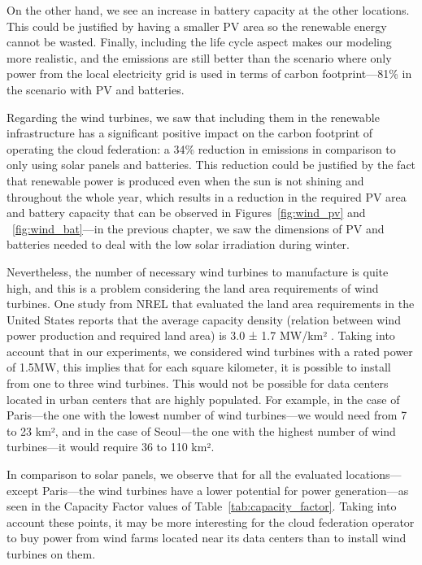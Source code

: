 On the other hand, we see an increase in battery capacity at the other locations. This could be justified by having a smaller PV area so the renewable energy cannot be wasted. Finally, including the life cycle aspect makes our modeling more realistic, and the emissions are still better than the scenario where only power from the local electricity grid is used in terms of carbon footprint---81\% in the scenario with PV and batteries.  


Regarding the wind turbines, we saw that including them in the renewable infrastructure has a significant positive impact on the carbon footprint of operating the cloud federation: a 34\% reduction in  emissions in comparison to only using solar panels and batteries. This reduction could be justified by the fact that renewable power is produced even when the sun is not shining and throughout the whole year, which results in a reduction in the required PV area and battery capacity that can be observed in Figures~\ref{fig:wind_pv} and ~\ref{fig:wind_bat}---in the previous chapter, we saw the dimensions of PV and batteries needed to deal with the low solar irradiation during winter.

Nevertheless, the number of necessary wind turbines to manufacture is quite high, and this is a problem considering the land area requirements of wind turbines. One study from NREL that evaluated the land area requirements in the United States reports that the average capacity density (relation between wind power production and required land area) is 3.0 ± 1.7 MW/km² \cite{wtlanduse_2009}. Taking into account that in our experiments, we considered wind turbines with a rated power of 1.5MW, this implies that for each square kilometer, it is possible to install from one to three wind turbines. This would not be possible for data centers located in urban centers that are highly populated. For example, in the case of Paris---the one with the lowest number of wind turbines---we would need from 7 to 23 km², and in the case of Seoul---the one with the highest number of wind turbines---it would require 36 to 110 km². 

In comparison to solar panels, we observe that for all the evaluated locations---except Paris---the wind turbines have a lower potential for power generation---as seen in the Capacity Factor values of Table~\ref{tab:capacity_factor}. Taking into account these points, it may be more interesting for the cloud federation operator to buy power from wind farms located near its data centers than to install wind turbines on them.

